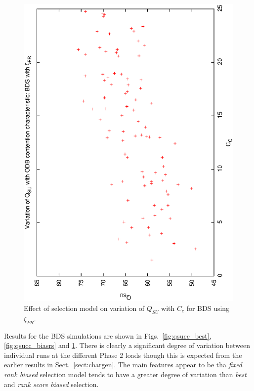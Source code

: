 \begin{figure}[h]

\begin{center}
 \includegraphics[scale=0.5, angle=-90]{figures/qsucc_biasfr.eps}
 \caption[Effect of selection model on variation of $Q_{SU}$ with $C_c$ for BDS using $\zeta_{FR}$.] 
   {Effect of selection model on variation of $Q_{SU}$ with $C_c$ for BDS using $\zeta_{FR}$.} 
\label{fig:qsucc_biasfr}
\end{center}
\end{figure}

Results for the BDS simulations are shown in Figs.~\ref{fig:qsucc_best}, \ref{fig:qsucc_biasrs} and \ref{fig:qsucc_biasfr}. There is clearly a significant degree of variation between individual runs at the different Phase 2 loads though this is expected from the earlier results in Sect.~\ref{sect:chargen}. The main features appear to be tha \emph{fixed rank biased} selection model tends to have a greater degree of variation than \emph{best} and \emph{rank score biased} selection. 

